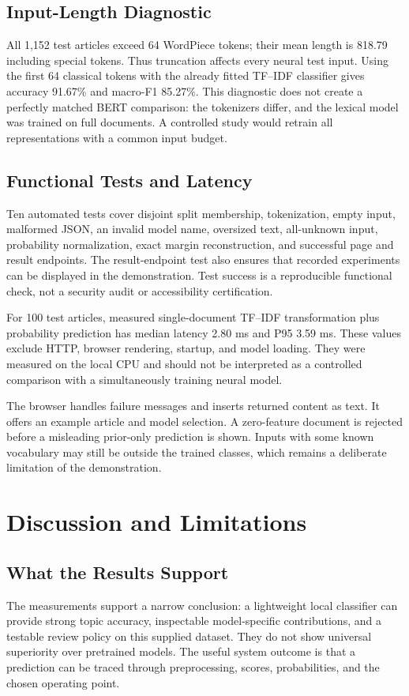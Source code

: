 \documentclass[11pt]{article}
\begin{document}
\subsection{Input-Length Diagnostic}
All 1,152 test articles exceed 64 WordPiece tokens; their mean length is 818.79 including special tokens. Thus truncation affects every neural test input. Using the first 64 classical tokens with the already fitted TF--IDF classifier gives accuracy 91.67\% and macro-F1 85.27\%. This diagnostic does not create a perfectly matched BERT comparison: the tokenizers differ, and the lexical model was trained on full documents. A controlled study would retrain all representations with a common input budget.

\subsection{Functional Tests and Latency}
Ten automated tests cover disjoint split membership, tokenization, empty input, malformed JSON, an invalid model name, oversized text, all-unknown input, probability normalization, exact margin reconstruction, and successful page and result endpoints. The result-endpoint test also ensures that recorded experiments can be displayed in the demonstration. Test success is a reproducible functional check, not a security audit or accessibility certification.

For 100 test articles, measured single-document TF--IDF transformation plus probability prediction has median latency 2.80 ms and P95 3.59 ms. These values exclude HTTP, browser rendering, startup, and model loading. They were measured on the local CPU and should not be interpreted as a controlled comparison with a simultaneously training neural model.

The browser handles failure messages and inserts returned content as text. It offers an example article and model selection. A zero-feature document is rejected before a misleading prior-only prediction is shown. Inputs with some known vocabulary may still be outside the trained classes, which remains a deliberate limitation of the demonstration.
\clearpage
\section{Discussion and Limitations}
\subsection{What the Results Support}
The measurements support a narrow conclusion: a lightweight local classifier can provide strong topic accuracy, inspectable model-specific contributions, and a testable review policy on this supplied dataset. They do not show universal superiority over pretrained models. The useful system outcome is that a prediction can be traced through preprocessing, scores, probabilities, and the chosen operating point.
\end{document}
